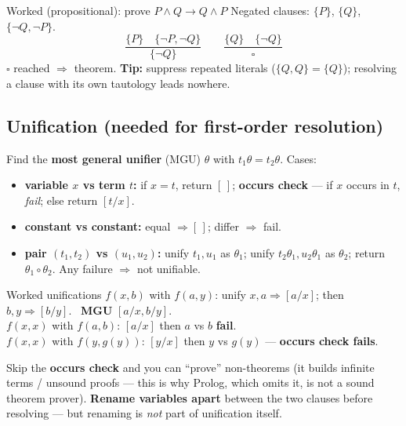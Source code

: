 \documentclass[11pt,a4paper]{article}
\newcommand{\imp}{\rightarrow}
\begin{document}
\begin{plain}{Worked (propositional): prove $P\wedge Q\imp Q\wedge P$}
Negated clauses: $\{P\}$, $\{Q\}$, $\{\neg Q,\neg P\}$.
\[
\frac{\{P\}\quad\{\neg P,\neg Q\}}{\{\neg Q\}}\qquad
\frac{\{Q\}\quad\{\neg Q\}}{\square}
\]
$\square$ reached $\Rightarrow$ theorem. \textbf{Tip:} suppress repeated literals ($\{Q,Q\}=\{Q\}$); resolving a clause with its own tautology leads nowhere.
\end{plain}

\subsection{Unification (needed for first-order resolution)}

\begin{must}[title=Unification algorithm (on term trees)]
Find the \textbf{most general unifier} (MGU) $\theta$ with $t_1\theta=t_2\theta$. Cases:
\begin{itemize}[leftmargin=*,itemsep=0pt]
  \item \textbf{variable $x$ vs term $t$:} if $x=t$, return $[\,]$; \textbf{occurs check} --- if $x$ occurs in $t$, \emph{fail}; else return $[t/x]$.
  \item \textbf{constant vs constant:} equal $\Rightarrow[\,]$; differ $\Rightarrow$ fail.
  \item \textbf{pair $(t_1,t_2)$ vs $(u_1,u_2)$:} unify $t_1,u_1$ as $\theta_1$; unify $t_2\theta_1,u_2\theta_1$ as $\theta_2$; return $\theta_1\circ\theta_2$. Any failure $\Rightarrow$ not unifiable.
\end{itemize}
\end{must}

\begin{plain}{Worked unifications}
$f(x,b)$ with $f(a,y)$: unify $x,a\Rightarrow[a/x]$; then $b,y\Rightarrow[b/y]$. \ \textbf{MGU} $[a/x,b/y]$.\\
$f(x,x)$ with $f(a,b)$: $[a/x]$ then $a$ vs $b$ \textbf{fail}.\\
$f(x,x)$ with $f(y,g(y))$: $[y/x]$ then $y$ vs $g(y)$ --- \textbf{occurs check fails}.
\end{plain}

\begin{gotcha}
Skip the \textbf{occurs check} and you can ``prove'' non-theorems (it builds infinite terms / unsound proofs --- this is why Prolog, which omits it, is not a sound theorem prover). \textbf{Rename variables apart} between the two clauses before resolving --- but renaming is \emph{not} part of unification itself.
\end{gotcha}
\end{document}
